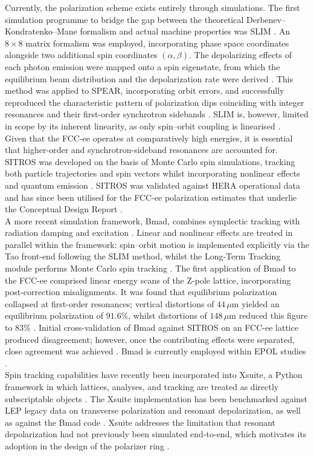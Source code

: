 \documentclass[%
 aip,
 amsmath,amssymb,
 reprint,%
superscriptaddress
]{revtex4-2}
\begin{document}
Currently, the polarization scheme exists entirely through simulations.
The first simulation programme to bridge the gap between the theoretical Derbenev–Kondratenko–Mane formalism and actual machine properties was SLIM \cite{chao_1981}.
An $8\times8$ matrix formalism was employed, incorporating phase space coordinates alongside two additional spin coordinates $(\alpha,\beta)$.
The depolarizing effects of each photon emission were mapped onto a spin eigenstate, from which the equilibrium beam distribution and the depolarization rate were derived \cite{chao_1981}.
This method was applied to SPEAR, incorporating orbit errors, and successfully reproduced the characteristic pattern of polarization dips coinciding with integer resonances and their first-order synchrotron sidebands \cite{chao_1981}.
SLIM is, however, limited in scope by its inherent linearity, as only spin–orbit coupling is linearised \cite{kewisch_1983}.
\\
Given that the FCC-ee operates at comparatively high energies, it is essential that higher-order and synchrotron-sideband resonances are accounted for.
SITROS was developed on the basis of Monte Carlo spin simulations, tracking both particle trajectories and spin vectors whilst incorporating nonlinear effects and quantum emission \cite{kewisch_1983}.
SITROS was validated against HERA operational data \cite{kewisch_1983} and has since been utilised for the FCC-ee polarization estimates that underlie the Conceptual Design Report \cite{gianfelice_2016}.
\\
A more recent simulation framework, Bmad, combines symplectic tracking with radiation damping and excitation \cite{sagan_2006}.
Linear and nonlinear effects are treated in parallel within the framework: spin–orbit motion is implemented explicitly via the Tao front-end following the SLIM method, whilst the Long-Term Tracking module performs Monte Carlo spin tracking \cite{wu_eefact22}.
The first application of Bmad to the FCC-ee comprised linear energy scans of the Z-pole lattice, incorporating post-correction misalignments.
It was found that equilibrium polarization collapsed at first-order resonances; vertical distortions of $44\,\mu\text{m}$ yielded an equilibrium polarization of $91.6\%$, whilst distortions of $148\,\mu\text{m}$ reduced this figure to $83\%$ \cite{wu_eefact22}.
Initial cross-validation of Bmad against SITROS on an FCC-ee lattice produced disagreement; however, once the contributing effects were separated, close agreement was achieved \cite{wu_ipac23}.
Bmad is currently employed within EPOL studies \cite{keintzel_wu_kiel_sagan_wilkinson_oide_bauche_hofle_blondel_jiang_2025}.
\\
Spin tracking capabilities have recently been incorporated into Xsuite, a Python framework in which lattices, analyses, and tracking are treated as directly subscriptable objects \cite{wenninger_iadarola_2026,iadarola_hb23}.
The Xsuite implementation has been benchmarked against LEP legacy data on transverse polarization and resonant depolarization, as well as against the Bmad code \cite{wenninger_iadarola_2026,iadarola:ipac2026-mop1028}.
Xsuite addresses the limitation that resonant depolarization had not previously been simulated end-to-end, which motivates its adoption in the design of the polarizer ring \cite{keskar_bartosik_carli_2026}.
\end{document}
